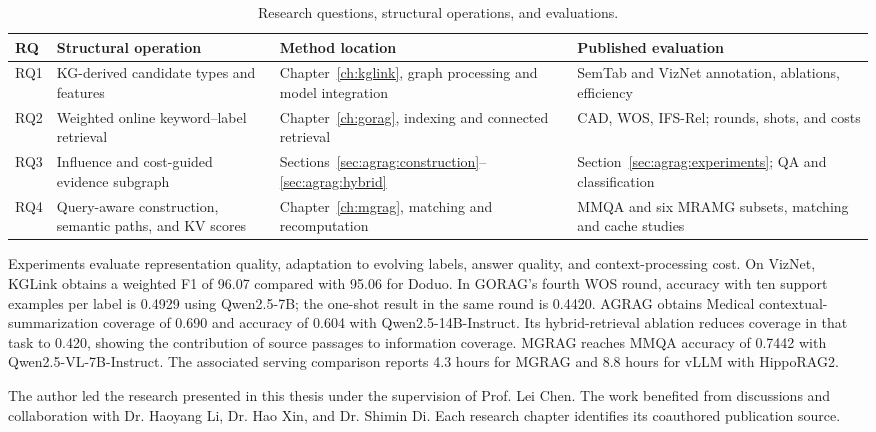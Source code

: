 \begin{table}[!htbp]
\centering\small
\caption{Research questions, structural operations, and evaluations.}
\label{tab:introduction:questions}
\begin{tabular}{>{\raggedright\arraybackslash}p{}>{\raggedright\arraybackslash}p{}>{\raggedright\arraybackslash}p{}>{\raggedright\arraybackslash}p{}}
\toprule
RQ & Structural operation & Method location & Published evaluation\\
\midrule
RQ1 & KG-derived candidate types and features & Chapter~\ref{ch:kglink}, graph processing and model integration & SemTab and VizNet annotation, ablations, efficiency\\
RQ2 & Weighted online keyword--label retrieval & Chapter~\ref{ch:gorag}, indexing and connected retrieval & CAD, WOS, IFS-Rel; rounds, shots, and costs\\
RQ3 & Influence and cost-guided evidence subgraph & Sections~\ref{sec:agrag:construction}--\ref{sec:agrag:hybrid} & Section~\ref{sec:agrag:experiments}; QA and classification\\
RQ4 & Query-aware construction, semantic paths, and KV scores & Chapter~\ref{ch:mgrag}, matching and recomputation & MMQA and six MRAMG subsets, matching and cache studies\\
\bottomrule
\end{tabular}
\end{table}

Experiments evaluate representation quality, adaptation to evolving labels, answer quality, and context-processing cost. On VizNet, KGLink obtains a weighted F1 of 96.07 compared with 95.06 for Doduo. In GORAG's fourth WOS round, accuracy with ten support examples per label is 0.4929 using Qwen2.5-7B; the one-shot result in the same round is 0.4420. AGRAG obtains Medical contextual-summarization coverage of 0.690 and accuracy of 0.604 with Qwen2.5-14B-Instruct. Its hybrid-retrieval ablation reduces coverage in that task to 0.420, showing the contribution of source passages to information coverage. MGRAG reaches MMQA accuracy of 0.7442 with Qwen2.5-VL-7B-Instruct. The associated serving comparison reports 4.3 hours for MGRAG and 8.8 hours for vLLM with HippoRAG2.

The author led the research presented in this thesis under the supervision of Prof. Lei Chen. The work benefited from discussions and collaboration with Dr. Haoyang Li, Dr. Hao Xin, and Dr. Shimin Di. Each research chapter identifies its coauthored publication source.

